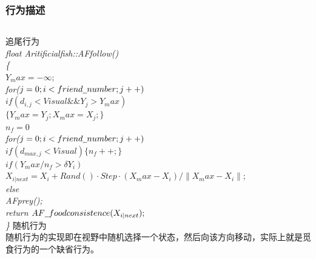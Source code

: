 \begin{frame}
\begin{columns}
		\end{columns}
		
\end{frame}

\begin{frame}
	\frametitle{行为描述}
		\begin{columns}
		\small{追尾行为}\vspace{3ex}\\
			\flushleft\scriptsize{\emph{float Aritificial\underline{\hspace{0.5em}}fish::AF\underline{\hspace{0.5em}}follow() \\ {\{} \\ {\qquad $Y_max=-\infty;$} \\ {\qquad for($j=0;i<friend\underline{\hspace{0.5em}}number;j++)$} \\ {\qquad\qquad $if(d_{i,j}<Visual \&\& Y_j>Y_max)$} \\ {\qquad\qquad\qquad $\{ Y_max=Y_j; X_max=X_j; \}$ }\\{\qquad $n_f=0$}\\{\qquad for($j=0;i<friend\underline{\hspace{0.5em}}number;j++)$}\\{\qquad\qquad $if(d_{max,j}<Visual) \{ n_f++;\} $}\\{\qquad $if (Y_max/n_f>\delta Y_i)$}\\{\qquad\qquad $X_{i|next}=X_i+Rand()·Step·(X_max-X_i)/\lVert X_max-X_i\rVert;$}\\{\qquad else}\\{\qquad\qquad AF\underline{\hspace{0.5em}}prey();}\\{ return $AF\underline{\hspace{0.5em}}foodconsistence(X_{i|next});$} \\{\}} }}
		\small{随机行为}\vspace{3ex}\\
		\vspace{6ex}随机行为的实现即在视野中随机选择一个状态，然后向该方向移动，实际上就是觅食行为的一个缺省行为。
		\end{columns}
\end{frame}

